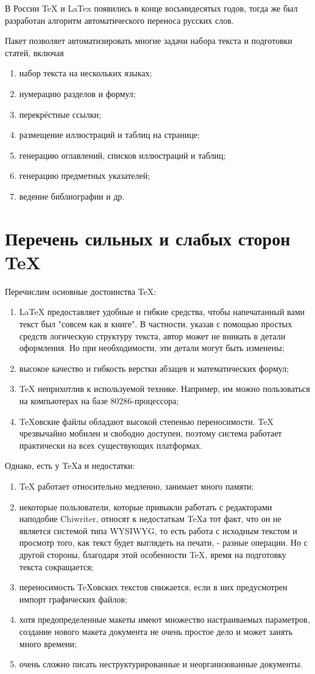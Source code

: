 \documentclass[a4paper,14pt]{report} %
\begin{document}
В России TeX и LaTex появились в конце восьмидесятых годов, тогда же был разработан алгоритм автоматического переноса русских слов. \par
Пакет позволяет автоматизировать многие задачи набора текста и подготовки статей, включая
\begin{enumerate} 
\item набор текста на нескольких языках;
\item нумерацию разделов и формул;
\item перекрёстные ссылки;
\item размещение иллюстраций и таблиц на странице;
\item генерацию оглавлений, списков иллюстраций и таблиц;
\item генерацию предметных указателей;
\item ведение библиографии и др.
\end{enumerate}
\section{Перечень сильных и слабых сторон TeX}
Перечислим основные достоинства TeX:
\begin{enumerate} %
\item LaTeX предоставляет удобные и гибкие средства, чтобы напечатанный вами текст был "совсем как в книге". В частности, указав с помощью простых средств логическую структуру текста, автор может не вникать в детали оформления. Но при необходимости, эти детали могут быть изменены;
\item высокое качество и гибкость верстки абзацев и математических формул;
\item TeX неприхотлив к используемой технике. Например, им можно пользоваться на компьютерах на базе 80286-процессора;
\item TeXовские файлы обладают высокой степенью переносимости. TeX чрезвычайно мобилен и свободно доступен, поэтому система работает практически на всех существующих платформах.
\end{enumerate}\par
Однако, есть у TeXа и недостатки:
\begin{enumerate} 
\item TeX работает относительно медленно, занимает много памяти;
\item некоторые пользователи, которые привыкли работать с редакторами наподобие Chiwriter, относят к недостаткам TeXа тот факт, что он не является системой типа WYSIWYG, то есть работа с исходным текстом и просмотр того, как текст будет выглядеть на печати, - разные операции. Но с другой стороны, благодаря этой особенности TeX, время на подготовку текста сокращается;
\item переносимость TeXовских текстов снижается, если в них предусмотрен импорт графических файлов;
\item хотя предопределенные макеты имеют множество настраиваемых параметров, создание нового макета документа не очень простое дело и может занять много времени;
\item очень сложно писать неструктурированные и неорганизованные документы.
\end{enumerate}
\end{document}
